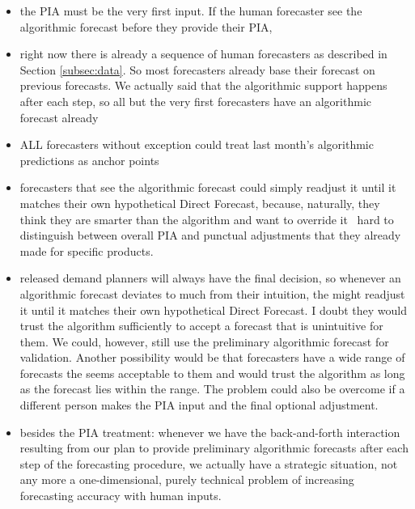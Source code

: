 \documentclass[12pt,a4paper]{article}
\begin{document}
\begin{itemize}
	\item the PIA must be the very first input. If the human forecaster see the algorithmic forecast before they provide their PIA, 
	\item right now there is already a sequence of human forecasters as described in Section  \ref{subsec:data}. So most forecasters already base their forecast on previous forecasts. We actually said that the algorithmic support happens after each step, so all but the very first forecasters have an algorithmic forecast already
	\item ALL forecasters without exception could treat last month's algorithmic predictions as anchor points
	\item forecasters that see the algorithmic forecast could simply readjust it until it matches their own hypothetical Direct Forecast, because, naturally, they think they are smarter than the algorithm and want to override it
	\ hard to distinguish between overall PIA and punctual adjustments that they already made for specific products.
	\item released demand planners will always have the final decision, so whenever an algorithmic forecast deviates to much from their intuition, the might readjust it until it matches their own hypothetical Direct Forecast. I doubt they would trust the algorithm sufficiently to accept a forecast that is unintuitive for them. We could, however, still use the preliminary algorithmic forecast for validation. Another possibility would be that forecasters have a wide range of forecasts the seems acceptable to them and would trust the algorithm as long as the forecast lies within the range. The problem could also be overcome if a different person makes the PIA input and the final optional adjustment.
	\item besides the PIA treatment: whenever we have the back-and-forth interaction resulting from our plan to provide preliminary algorithmic forecasts after each step of the forecasting procedure, we actually have a strategic situation, not any more a one-dimensional, purely technical problem  of increasing forecasting accuracy with human inputs.
\end{itemize}


\pagebreak
\renewcommand\refname{Bibliography}


\end{document}
